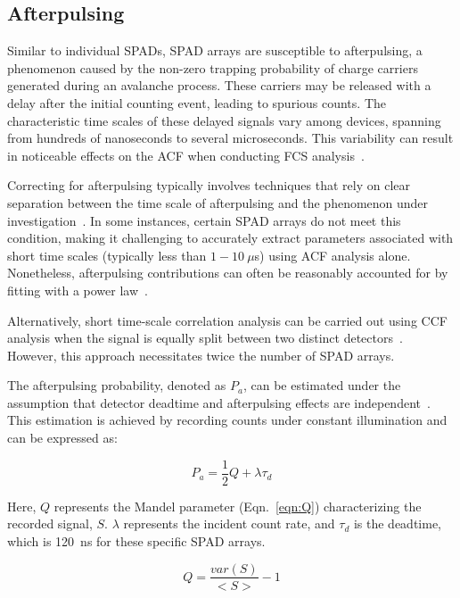 \subsection{Afterpulsing}
\label{sec:Pa}

Similar to individual \ac{SPAD}s, \ac{SPAD} arrays are susceptible to afterpulsing, a phenomenon caused by the non-zero trapping probability of charge carriers generated during an avalanche process. 
These carriers may be released with a delay after the initial counting event, leading to spurious counts. 
The characteristic time scales of these delayed signals vary among devices, spanning from hundreds of nanoseconds to several microseconds. 
This variability can result in noticeable effects on the \ac{ACF} when conducting \ac{FCS} analysis~\cite{colyer_BOE_2010,ingargiola_PLOS1_2016}.

Correcting for afterpulsing typically involves techniques that rely on clear separation between the time scale of afterpulsing and the phenomenon under investigation~\cite{zhao_AO_2003}. 
In some instances, certain \ac{SPAD} arrays do not meet this condition, making it challenging to accurately extract parameters associated with short time scales (typically less than $1-10~\mu$s) using \ac{ACF} analysis alone. 
Nonetheless, afterpulsing contributions can often be reasonably accounted for by fitting with a power law~\cite{colyer_BOE_2010,ingargiola_PLOS1_2016}.

Alternatively, short time-scale correlation analysis can be carried out using \ac{CCF} analysis when the signal is equally split between two distinct detectors~\cite{krichevsky_RPP_2002}. 
However, this approach necessitates twice the number of \ac{SPAD} arrays.

The afterpulsing probability, denoted as $P_a$, can be estimated under the assumption that detector deadtime and afterpulsing effects are independent~\cite{Finn_RSI_1988}. 
This estimation is achieved by recording counts under constant illumination and can be expressed as:

\begin{equation}
\label{eqn:Pa}
P_a=\frac{1}{2}Q+\lambda\tau_d
\end{equation}

\noindent
Here, $Q$ represents the Mandel parameter (Eqn.~\ref{eqn:Q}) characterizing the recorded signal, $S$. 
$\lambda$ represents the incident count rate, and $\tau_d$ is the deadtime, which is 120~ns for these specific \ac{SPAD} arrays.

\begin{equation}
\label{eqn:Q}
Q=\frac{var\left(S\right)}{<S>}-1
\end{equation}

